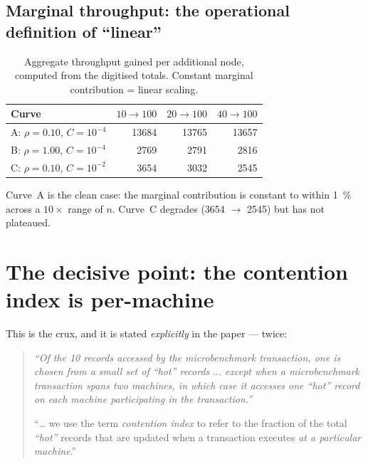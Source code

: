 \documentclass[11pt,a4paper]{article}
\newcommand{\hot}{C}
\begin{document}
\subsection*{Marginal throughput: the operational definition of ``linear''}

\begin{table}[H]
\centering
\caption{Aggregate throughput gained per additional node, computed from the
digitised totals. Constant marginal contribution = linear scaling.}
\label{tab:marginal}
\begin{tabular}{@{}lrrr@{}}
\toprule
\textbf{Curve} & \textbf{$10\to100$} & \textbf{$20\to100$} & \textbf{$40\to100$} \\
\midrule
A: $\rho{=}0.10$, $\hot{=}10^{-4}$ & \num{13684} & \num{13765} & \num{13657} \\
B: $\rho{=}1.00$, $\hot{=}10^{-4}$ & \num{2769}  & \num{2791}  & \num{2816}  \\
C: $\rho{=}0.10$, $\hot{=}10^{-2}$ & \num{3654}  & \num{3032}  & \num{2545}  \\
\bottomrule
\end{tabular}
\end{table}

Curve~A is the clean case: the marginal contribution is constant to within
\SI{1}{\percent} across a $10\times$ range of $n$.  Curve~C degrades
(\num{3654} $\to$ \num{2545}) but has not plateaued.

\section{The decisive point: the contention index is per-machine}
\label{sec:pernode}

This is the crux, and it is stated \emph{explicitly} in the paper --- twice:

\begin{quote}\small\itshape
``Of the 10 records accessed by the microbenchmark transaction, one is chosen
from a small set of \emph{``hot''} records $\ldots$ except when a
microbenchmark transaction spans two machines, in which case it accesses
\emph{one \emph{``hot''} record on each machine participating} in the
transaction.''
\par\medskip
``\ldots{} we use the term \emph{contention index} to refer to the fraction of
the total \emph{``hot''} records that are updated when a transaction executes
\emph{at a particular machine}.''
\end{quote}
\end{document}
